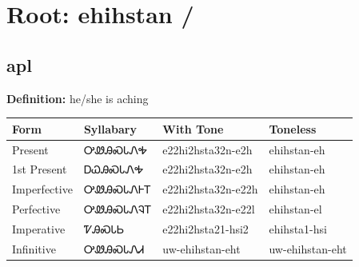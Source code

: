 \documentclass{article}%
\begin{document}
%
\normalsize%
\section*{Root: ehihstan / }%
\subsection*{apl}%
\textbf{Definition: }%
he/she is aching%
\\[0.5em]%
\begin{tabular}{|l|l|l|l|}%
\hline%
\textbf{Form}&\textbf{Syllabary}&\textbf{With Tone}&\textbf{Toneless}\\%
\hline%
Present&ᎤᏪᎯᏍᏓᏁᎭ&e22hi2hsta32n{-}e2h&ehihstan{-}eh\\%
1st Present&ᎠᏇᎯᏍᏓᏁᎭ&e22hi2hsta32n{-}e2h&ehihstan{-}eh\\%
Imperfective&ᎤᏪᎯᏍᏓᏁᎰᎢ&e22hi2hsta32n{-}e22h&ehihstan{-}eh\\%
Perfective&ᎤᏪᎯᏍᏓᏁᎸᎢ&e22hi2hsta32n{-}e22l&ehihstan{-}el\\%
Imperative&ᏤᎯᏍᏓᏏ&e22hi2hsta21{-}hsi2&ehihsta1{-}hsi\\%
Infinitive&ᎤᏪᎯᏍᏓᏁᏗ&uw{-}ehihstan{-}eht&uw{-}ehihstan{-}eht\\%
\hline%
\end{tabular}%
\\[1em]%
\end{document}
